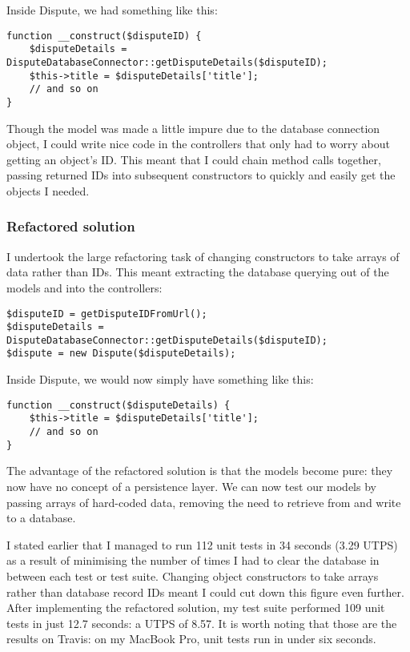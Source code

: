 Inside Dispute, we had something like this:

\begin{minipage}{\textwidth}
\begin{lstlisting}
function __construct($disputeID) {
    $disputeDetails = DisputeDatabaseConnector::getDisputeDetails($disputeID);
    $this->title = $disputeDetails['title'];
    // and so on
}
\end{lstlisting}
\end{minipage}

Though the model was made a little impure due to the database connection object, I could write nice code in the controllers that only had to worry about getting an object's ID. This meant that I could chain method calls together, passing returned IDs into subsequent constructors to quickly and easily get the objects I needed.

\subsubsection{Refactored solution}

I undertook the large refactoring task of changing constructors to take arrays of data rather than IDs. This meant extracting the database querying out of the models and into the controllers:

\begin{lstlisting}
$disputeID = getDisputeIDFromUrl();
$disputeDetails = DisputeDatabaseConnector::getDisputeDetails($disputeID);
$dispute = new Dispute($disputeDetails);
\end{lstlisting}

Inside Dispute, we would now simply have something like this:

\begin{lstlisting}
function __construct($disputeDetails) {
    $this->title = $disputeDetails['title'];
    // and so on
}
\end{lstlisting}

The advantage of the refactored solution is that the models become pure: they now have no concept of a persistence layer. We can now test our models by passing arrays of hard-coded data, removing the need to retrieve from and write to a database.

I stated earlier that I managed to run 112 unit tests in 34 seconds (3.29 UTPS) as a result of minimising the number of times I had to clear the database in between each test or test suite. Changing object constructors to take arrays rather than database record IDs meant I could cut down this figure even further. After implementing the refactored solution, my test suite performed 109 unit tests in just 12.7 seconds: a UTPS of 8.57. It is worth noting that those are the results on Travis: on my MacBook Pro, unit tests run in under six seconds. %

